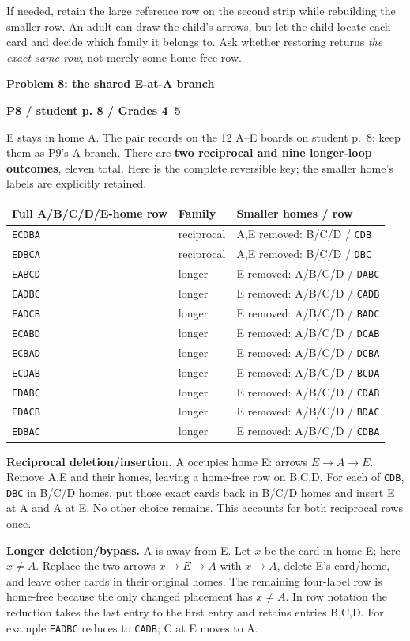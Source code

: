 \documentclass[11pt]{article}
\newcommand{\heading}[1]{\par\textbf{\large #1}\par}
\newcommand{\subhead}[1]{\par\textbf{#1}\par}
\newcommand{\row}[1]{\texttt{#1}}
\newcommand{\guidepage}{\newpage}
\begin{document}
If needed, retain the large reference row on the second strip while rebuilding the smaller row. An adult can draw the child's arrows, but let the child locate each card and decide which family it belongs to. Ask whether restoring returns \emph{the exact same row}, not merely some home-free row.

\guidepage
\heading{Problem 8: the shared E-at-A branch}
\subhead{P8 / student p. 8 / Grades 4--5}
E stays in home A. The pair records on the 12 A--E boards on student p.~8; keep them as P9's A branch. There are \textbf{two reciprocal and nine longer-loop outcomes}, eleven total. Here is the complete reversible key; the smaller home's labels are explicitly retained.

\begin{center}\begin{tabular}{@{}lll@{}}\toprule
Full A/B/C/D/E-home row & Family & Smaller homes / row\\\midrule
\row{ECDBA}&reciprocal&A,E removed: B/C/D / \row{CDB}\\
\row{EDBCA}&reciprocal&A,E removed: B/C/D / \row{DBC}\\\midrule
\row{EABCD}&longer&E removed: A/B/C/D / \row{DABC}\\
\row{EADBC}&longer&E removed: A/B/C/D / \row{CADB}\\
\row{EADCB}&longer&E removed: A/B/C/D / \row{BADC}\\
\row{ECABD}&longer&E removed: A/B/C/D / \row{DCAB}\\
\row{ECBAD}&longer&E removed: A/B/C/D / \row{DCBA}\\
\row{ECDAB}&longer&E removed: A/B/C/D / \row{BCDA}\\
\row{EDABC}&longer&E removed: A/B/C/D / \row{CDAB}\\
\row{EDACB}&longer&E removed: A/B/C/D / \row{BDAC}\\
\row{EDBAC}&longer&E removed: A/B/C/D / \row{CDBA}\\\bottomrule
\end{tabular}\end{center}

\textbf{Reciprocal deletion/insertion.} A occupies home E: arrows $E\to A\to E$. Remove A,E and their homes, leaving a home-free row on B,C,D. For each of \row{CDB}, \row{DBC} in B/C/D homes, put those exact cards back in B/C/D homes and insert E at A and A at E. No other choice remains. This accounts for both reciprocal rows once.

\textbf{Longer deletion/bypass.} A is away from E. Let $x$ be the card in home E; here $x\ne A$. Replace the two arrows $x\to E\to A$ with $x\to A$, delete E's card/home, and leave other cards in their original homes. The remaining four-label row is home-free because the only changed placement has $x\ne A$. In row notation the reduction takes the last entry to the first entry and retains entries B,C,D. For example \row{EADBC} reduces to \row{CADB}; C at E moves to A.
\end{document}
